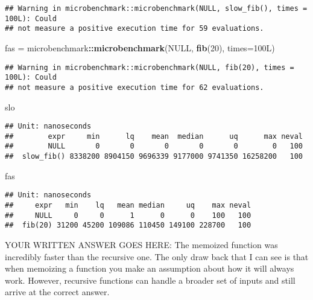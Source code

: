 \documentclass[
]{article}
\newenvironment{Shaded}{\begin{snugshade}}{\end{snugshade}}
\newcommand{\DataTypeTok}[1]{\textcolor[rgb]{0.13,0.29,0.53}{#1}}
\newcommand{\DecValTok}[1]{\textcolor[rgb]{0.00,0.00,0.81}{#1}}
\newcommand{\KeywordTok}[1]{\textcolor[rgb]{0.13,0.29,0.53}{\textbf{#1}}}
\newcommand{\NormalTok}[1]{#1}
\newcommand{\OperatorTok}[1]{\textcolor[rgb]{0.81,0.36,0.00}{\textbf{#1}}}
\newcommand{\OtherTok}[1]{\textcolor[rgb]{0.56,0.35,0.01}{#1}}
\newcommand{\StringTok}[1]{\textcolor[rgb]{0.31,0.60,0.02}{#1}}
\begin{document}
\begin{verbatim}
## Warning in microbenchmark::microbenchmark(NULL, slow_fib(), times = 100L): Could
## not measure a positive execution time for 59 evaluations.
\end{verbatim}

\begin{Shaded}
\begin{Highlighting}[]
\NormalTok{fas =}\StringTok{ }\NormalTok{microbenchmark}\OperatorTok{::}\KeywordTok{microbenchmark}\NormalTok{(}\OtherTok{NULL}\NormalTok{, }\KeywordTok{fib}\NormalTok{(}\DecValTok{20}\NormalTok{), }\DataTypeTok{times=}\NormalTok{100L)}
\end{Highlighting}
\end{Shaded}

\begin{verbatim}
## Warning in microbenchmark::microbenchmark(NULL, fib(20), times = 100L): Could
## not measure a positive execution time for 62 evaluations.
\end{verbatim}

\begin{Shaded}
\begin{Highlighting}[]
\NormalTok{slo }
\end{Highlighting}
\end{Shaded}

\begin{verbatim}
## Unit: nanoseconds
##        expr     min      lq    mean  median      uq      max neval
##        NULL       0       0       0       0       0        0   100
##  slow_fib() 8338200 8904150 9696339 9177000 9741350 16258200   100
\end{verbatim}

\begin{Shaded}
\begin{Highlighting}[]
\NormalTok{fas}
\end{Highlighting}
\end{Shaded}

\begin{verbatim}
## Unit: nanoseconds
##     expr   min    lq   mean median     uq    max neval
##     NULL     0     0      1      0      0    100   100
##  fib(20) 31200 45200 109086 110450 149100 228700   100
\end{verbatim}

YOUR WRITTEN ANSWER GOES HERE: The memoized function was incredibly
faster than the recursive one. The only draw back that I can see is that
when memoizing a function you make an assumption about how it will
always work. However, recursive functions can handle a broader set of
inputs and still arrive at the correct answer.
\end{document}
